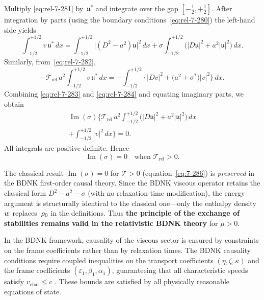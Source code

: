 Multiply \eqref{eq:rel-7-281} by~$\mathfrak{u}^{*}$ and integrate over
the gap $[-\tfrac{1}{2},+\tfrac{1}{2}]$.  After integration by parts
(using the boundary conditions~\eqref{eq:rel-7-280}) the left-hand side
yields
\begin{equation}
\label{eq:rel-7-283}
\int_{-1/2}^{+1/2} v\,\mathfrak{u}^{*}\,dx
= \int_{-1/2}^{+1/2} \bigl|(D^{2}-a^{2})\mathfrak{u}\bigr|^{2}\,dx
  + \sigma
    \int_{-1/2}^{+1/2}
    \bigl(|D\mathfrak{u}|^{2}+a^{2}|\mathfrak{u}|^{2}\bigr)\,dx.
\end{equation}
Similarly, from~\eqref{eq:rel-7-282},
\begin{equation}
\label{eq:rel-7-284}
-\mathscr{T}_{\mathrm{rel}}\,a^{2}
\int_{-1/2}^{+1/2} v\,\mathfrak{u}^{*}\,dx
= -\int_{-1/2}^{+1/2}
  \bigl\{|Dv|^{2}+\bigl(a^{2}+\sigma^{*}\bigr)
  |v|^{2}\bigr\}\,dx.
\end{equation}
Combining \eqref{eq:rel-7-283} and \eqref{eq:rel-7-284} and equating
imaginary parts, we obtain
\begin{multline}
\label{eq:rel-7-285}
\operatorname{Im}(\sigma)\Biggl\{
  \mathscr{T}_{\mathrm{rel}}\,a^{2}
  \int_{-1/2}^{+1/2}
    \bigl(|D\mathfrak{u}|^{2}+a^{2}|\mathfrak{u}|^{2}\bigr)\,dx \\
  +\int_{-1/2}^{+1/2} |v|^{2}\,dx
\Biggr\} = 0.
\end{multline}
All integrals are positive definite.  Hence
\begin{equation}
\label{eq:rel-7-286}
\operatorname{Im}(\sigma) = 0
\quad\text{when } \mathscr{T}_{\mathrm{rel}} > 0.
\end{equation}

\begin{relcorrection}
The classical result $\operatorname{Im}(\sigma)=0$ for
$\mathscr{T}>0$ (equation~\eqref{eq:7-286}) is \emph{preserved} in
the BDNK first-order causal theory.  Since the BDNK viscous operator
retains the classical form $D^{2}-a^{2}-\sigma$ (with no
relaxation-time modification), the energy argument is
structurally identical to the classical one---only the enthalpy
density $w$ replaces~$\rho_0$ in the definitions.
Thus \textbf{the principle of the exchange of stabilities remains
valid in the relativistic BDNK theory} for $\mu > 0$.
\end{relcorrection}

\begin{causalitycheck}
In the BDNK framework, causality of the viscous sector is ensured by
constraints on the frame coefficients rather than by relaxation times.
The BDNK causality conditions require coupled inequalities on the
transport coefficients $(\eta, \zeta, \kappa)$ and the frame
coefficients $(\varepsilon_{1}, \beta_{1}, \alpha_{1})$, guaranteeing
that all characteristic speeds satisfy $v_{\mathrm{char}} \le c$
\citep{BemficaDN2018,Kovtun2019,BemficaDNK2023}.  These bounds are
satisfied by all physically reasonable equations of state.
\end{causalitycheck}

